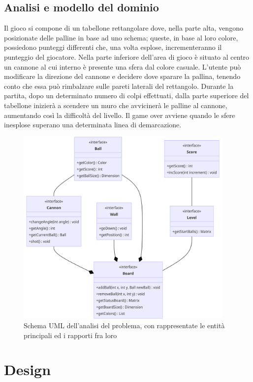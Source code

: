 \documentclass[a4paper,12pt]{report}
\begin{document}
\section{Analisi e modello del dominio}

Il gioco si compone di un tabellone rettangolare dove, nella parte alta, vengono posizionate delle palline in base ad uno schema; queste, in base al loro colore, possiedono punteggi differenti che, una volta esplose, incrementeranno il punteggio del giocatore. Nella parte inferiore dell'area di gioco è situato al centro un cannone al cui interno è presente una sfera dal colore casuale. L'utente può modificare la direzione del cannone e decidere dove sparare la pallina, tenendo conto che essa può rimbalzare sulle pareti laterali del rettangolo. Durante la partita, dopo un determinato numero di colpi effettuati, dalla parte superiore del tabellone inizierà a scendere un muro che avvicinerà le palline al cannone, aumentando così la difficoltà del livello. Il game over avviene quando le sfere inesplose superano una determinata linea di demarcazione. 

\begin{figure}[H]
\centering{}
\includegraphics[width=0.95\textwidth]{img/Diagramma_UML_Analisi_Dominio}
\caption{Schema UML dell'analisi del problema, con rappresentate le entità principali ed i rapporti fra loro}
\label{img:analysis}
\end{figure}

\chapter{Design}
\end{document}
